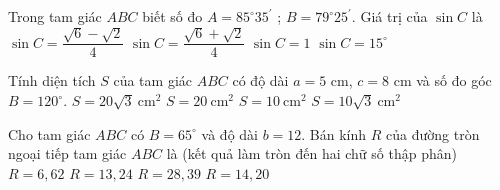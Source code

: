 \begin{ex}%
Trong tam giác $ABC$ biết số đo $A=85^{\circ} 35^{\prime}$ ; $B=79^{\circ} 25^{\prime}$. Giá trị của $\sin C$ là
	\choice
	{\True $\sin C=\dfrac{\sqrt{6}-\sqrt{2}}{4}$}
	{$\sin C=\dfrac{\sqrt{6}+\sqrt{2}}{4}$}
	{$\sin C=1$}
	{$\sin C=15^{\circ}$}
\end{ex}
\begin{ex}%
	Tính diện tích $S$ của tam giác $ABC$ có độ dài $a=5$ cm, $c=8$ cm và số đo góc $B=120^{\circ}$.
	\choice
	{$S=20\sqrt{3} \mathrm{~cm}^2$}
	{$S=20 \mathrm{~cm}^2$}
	{$S=10 \mathrm{~cm}^2$}
	{\True $S=10 \sqrt{3} \mathrm{~cm}^2$}
\end{ex}
\begin{ex}%
		Cho tam giác $ABC$ có $B=65^{\circ}$ và độ dài $b=12$. Bán kính $R$ của đường tròn ngoại tiếp tam giác $ABC$ là (kết quả làm tròn đến hai chữ số thập phân)
	\choice
	{\True $R=6{,}62$}
	{$R=13{,}24$}
	{$R=28{,}39$}
	{$R=14{,}20$}
\end{ex}
